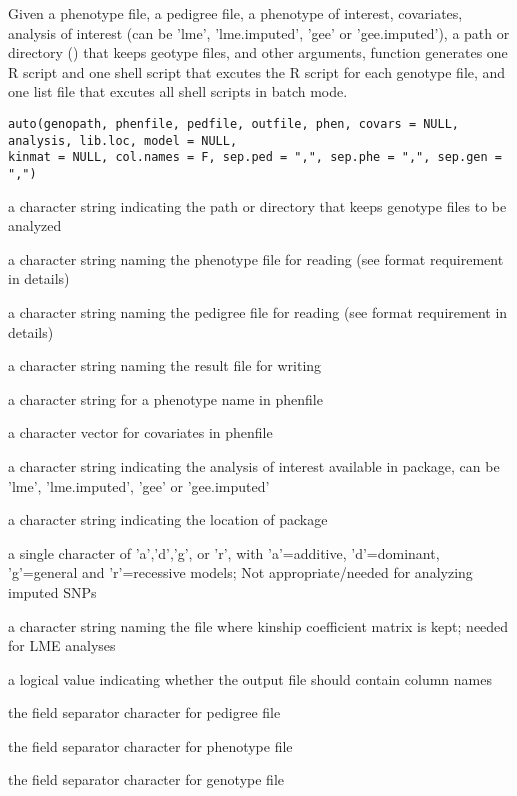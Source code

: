 \begin{Description}\relax
Given a phenotype file, a pedigree file, a phenotype of interest, covariates, analysis of interest
(can be 'lme', 'lme.imputed', 'gee' or 'gee.imputed'), a path or directory () that keeps geotype files, 
and other arguments,  function generates one R script and one shell script that excutes the
R script for each genotype file, and one list file that excutes all shell scripts in batch mode.
\end{Description}
\begin{Usage}
\begin{verbatim}
auto(genopath, phenfile, pedfile, outfile, phen, covars = NULL, analysis, lib.loc, model = NULL, 
kinmat = NULL, col.names = F, sep.ped = ",", sep.phe = ",", sep.gen = ",")
\end{verbatim}
\end{Usage}
\begin{Arguments}
\begin{ldescription}
\item[\code{genopath}] a character string indicating the path or directory that keeps genotype files to be analyzed 
\item[\code{phenfile}] a character string naming the phenotype file for reading (see format requirement in details) 
\item[\code{pedfile}] a character string naming the pedigree file for reading (see format requirement in details) 
\item[\code{outfile}] a character string naming the result file for writing 
\item[\code{phen}] a character string for a phenotype name in phenfile 
\item[\code{covars}] a character vector for covariates in phenfile 
\item[\code{analysis}] a character string indicating the analysis of interest available in  package, can be 'lme', 'lme.imputed', 'gee' or 'gee.imputed' 
\item[\code{lib.loc}] a character string indicating the location of  package 
\item[\code{model}] a single character of 'a','d','g', or 'r', with 'a'=additive, 'd'=dominant, 'g'=general and 'r'=recessive models; Not appropriate/needed for analyzing imputed SNPs 
\item[\code{kinmat}] a character string naming the file where kinship coefficient matrix is kept; needed for LME analyses 
\item[\code{col.names}] a logical value indicating whether the output file should contain column names 
\item[\code{sep.ped}] the field separator character for pedigree file 
\item[\code{sep.phe}] the field separator character for phenotype file 
\item[\code{sep.gen}] the field separator character for genotype file 
\end{ldescription}
\end{Arguments}
